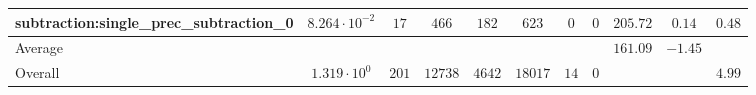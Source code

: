 \begin{tabular}{|l|c|c|c|c|c|c|c|c|c|c|}
subtraction:single\_prec\_subtraction\_0         & $ 8.264 \cdot 10^{-2} $ & $ 17     $ & $ 466   $ & $ 182  $ & $ 623   $ & $ 0  $ & $ 0 $ & $ 205.72      $ & $ 0.14    $ & $ 0.48    $ \\
\hline
Average                                          & $                     $ & $        $ & $       $ & $      $ & $       $ & $    $ & $   $ & $ 161.09      $ & $ -1.45   $ & $         $ \\
\hline
Overall                                          & $ 1.319 \cdot 10^{0}  $ & $ 201    $ & $ 12738 $ & $ 4642 $ & $ 18017 $ & $ 14 $ & $ 0 $ & $             $ & $         $ & $ 4.99    $ \\
\hline
\end{tabular}
